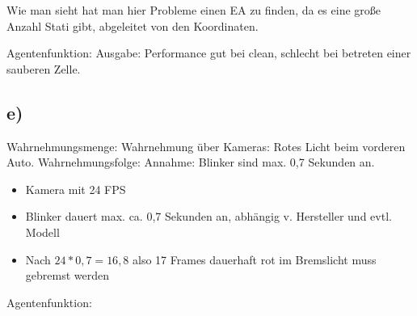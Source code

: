 \documentclass[10pt]{article}%
\theoremstyle{nonumberplain}
\begin{document}
Wie man sieht hat man hier Probleme einen EA zu finden, da es eine große Anzahl Stati gibt, abgeleitet von den Koordinaten.

Agentenfunktion: Ausgabe: Performance gut bei clean, schlecht bei betreten einer sauberen Zelle.

\subsection{e)}
Wahrnehmungsmenge:
Wahrnehmung über Kameras: Rotes Licht beim vorderen Auto.
Wahrnehmungsfolge:
Annahme: Blinker sind max. 0,7 Sekunden an.
\begin{itemize} 
	\item Kamera mit 24 FPS
	\item Blinker dauert max. ca. 0,7 Sekunden an, abhängig v. Hersteller und evtl. Modell
	\item Nach $24 * 0,7 = 16,8$ also 17 Frames dauerhaft rot im Bremslicht muss gebremst werden
\end{itemize}
Agentenfunktion:

\end{document}
